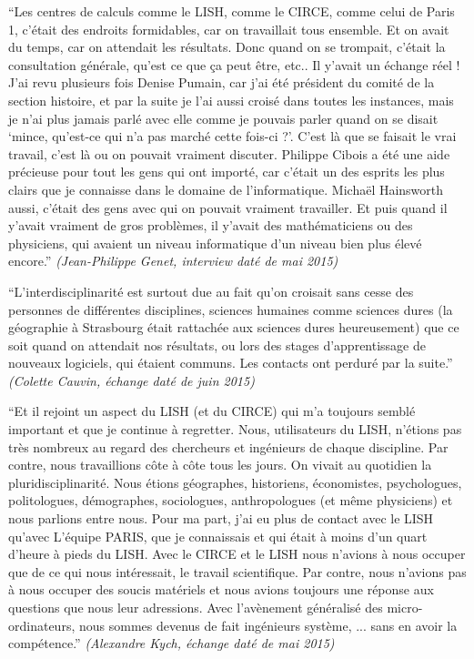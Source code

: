 \enquote{Les centres de calculs comme le LISH, comme le CIRCE, comme celui de Paris 1, c'était des endroits formidables, car on travaillait tous ensemble. Et on avait du temps, car on attendait les résultats. Donc quand on se trompait, c'était la consultation générale, qu'est ce que ça peut être, etc..  Il y'avait un échange réel ! J'ai revu plusieurs fois Denise Pumain, car j'ai été président du comité de la section histoire, et par la suite je l'ai aussi croisé dans toutes les instances, mais je n'ai plus jamais parlé avec elle comme je pouvais parler quand on se disait \enquote{mince, qu'est-ce qui n'a pas marché cette fois-ci ?}. C'est là que se faisait le vrai travail, c'est là ou on pouvait vraiment discuter. Philippe Cibois a été une aide précieuse pour tout les gens qui ont importé, car c'était un des esprits les plus clairs que je connaisse dans le domaine de l'informatique. Michaël Hainsworth aussi, c'était des gens avec qui on pouvait vraiment travailler. Et puis quand il y'avait vraiment de gros problèmes, il y'avait des mathématiciens ou des physiciens, qui avaient un niveau informatique d'un niveau bien plus élevé encore.} \textit{(Jean-Philippe Genet, interview daté de mai 2015)}

\enquote{L’interdisciplinarité est surtout due au fait qu’on croisait sans cesse des personnes de différentes disciplines, sciences humaines comme sciences dures (la géographie à Strasbourg était rattachée aux sciences dures heureusement) que ce soit quand on attendait nos résultats, ou lors des stages d’apprentissage de nouveaux logiciels, qui étaient communs. Les contacts ont perduré par la suite.} \textit{(Colette Cauvin, échange daté de juin 2015)}

\enquote{Et il rejoint un aspect du LISH (et du CIRCE) qui m'a toujours semblé important et que je continue à regretter. Nous, utilisateurs du LISH, n'étions pas très nombreux au regard des chercheurs et ingénieurs de chaque discipline. Par contre, nous travaillions côte à côte tous les jours. On vivait au quotidien la pluridisciplinarité. Nous étions géographes, historiens, économistes, psychologues, politologues, démographes, sociologues, anthropologues (et même physiciens) et nous parlions entre nous. Pour ma part, j'ai eu plus de contact avec le LISH qu'avec L'équipe PARIS, que je connaissais et qui était à moins d'un quart d'heure à pieds du LISH. Avec le CIRCE et le LISH nous n'avions à nous occuper que de ce qui nous intéressait, le travail scientifique. Par contre, nous n'avions pas à nous occuper des soucis matériels et nous avions toujours une réponse aux questions que nous leur adressions. Avec l'avènement généralisé des micro-ordinateurs, nous sommes devenus de fait ingénieurs système, ... sans en avoir la compétence.} \textit{(Alexandre Kych, échange daté de mai 2015)}


